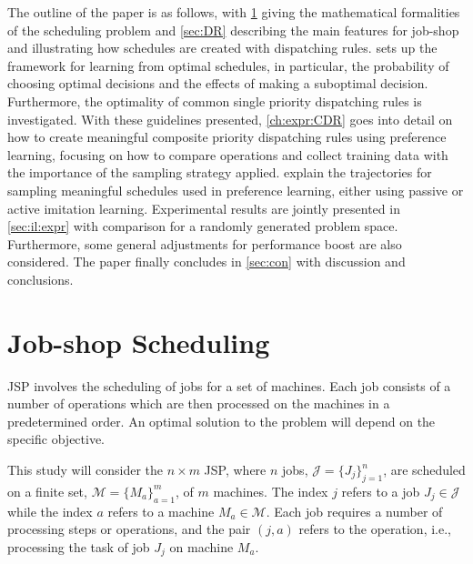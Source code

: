 \documentclass[twocolumn]{svjour3}
\newcommand{\dr}{dispatching rule}
\newcommand{\cdr}{composite priority \dr}
\newcommand{\sdr}{single priority \dr}
\begin{document}
The outline of the paper is as follows, with \cref{sec:problemdef} giving the 
mathematical formalities of the scheduling problem and 
\cref{sec:DR} describing the main features for job-shop 
and illustrating how schedules are created with \dr s. 
 sets up the framework for learning from optimal schedules,  
in particular, the probability of choosing optimal decisions and the effects of 
making a suboptimal decision. Furthermore, the optimality of common \sdr s is 
investigated.
With these guidelines presented, \cref{ch:expr:CDR} goes into detail on how to 
create 
meaningful \cdr s using preference learning, focusing on how to 
compare operations and collect training data with the importance of  the
sampling strategy applied. 
 explain the trajectories for 
sampling meaningful schedules used in preference learning, either 
using passive or active imitation learning. 
Experimental results are jointly presented in \cref{sec:il:expr} with 
comparison for a randomly generated problem space. 
Furthermore, some general adjustments for performance boost are also considered.
The paper finally concludes in \cref{sec:con} with discussion and conclusions.

\section{Job-shop Scheduling}\label{sec:problemdef}
JSP involves the scheduling of jobs for a set of 
machines. Each job consists of a number of operations which are then processed 
on the machines in a predetermined order. An optimal solution to the problem 
will depend on the specific objective. 

This study will consider the $n\times m$ JSP, where $n$ jobs, 
$\mathcal{J}=\{J_j\}_{j=1}^n$, are scheduled on a finite set, 
$\mathcal{M}=\{M_a\}_{a=1}^m$, of $m$ machines. The index $j$ refers to a job 
$J_j\in\mathcal{J}$ while the index $a$ refers to a machine 
$M_a\in\mathcal{M}$. 
Each job requires a number of processing steps or operations, and the pair 
$(j,a)$ refers to the operation, i.e., processing the task of job $J_j$ on 
machine $M_a$. 
\end{document}
